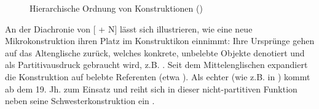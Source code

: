 \begin{figure}
\caption {Hierarchische Ordnung von Konstruktionen ()} 
\label{abb:quant-schema}
\end{figure}
 


An der Diachronie von [ + N] lässt sich illustrieren, wie eine neue Mikrokonstruktion ihren Platz im Konstruktikon einnimmt: Ihre Ursprünge gehen auf das Altenglische  zurück, welches konkrete, unbelebte Objekte denotiert und als Partitivausdruck gebraucht wird, z.B.   \parencite[230]{Traugott2008a}. Seit dem Mittelenglischen expandiert die Konstruktion auf  belebte Referenten (etwa ). Als echter  (wie z.B. in  ) kommt  ab dem 19. Jh. zum Einsatz  und reiht sich in dieser nicht-partitiven Funktion neben seine Schwesterkonstruktion  ein \parencite[weiterführend s.][23f.]{Traugott2013}.


